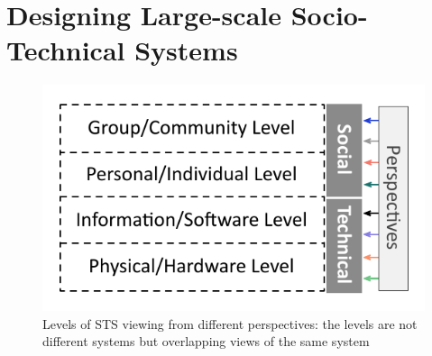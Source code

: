 \section{Designing Large-scale Socio-Technical Systems}
\label{sec:design}



\begin{figure}[t]
\sidecaption[t]
\includegraphics[scale=.5]{img/sts_levels.pdf}
\caption{Levels of STS viewing from different perspectives: the levels are not different systems but overlapping views of the same system \cite{Whitworth2009,Whitworth2013}}
\label{fig:sts_levels} 
\end{figure}

